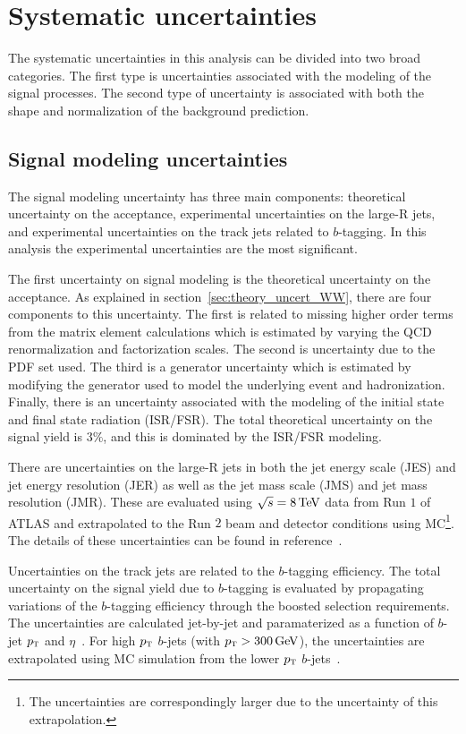\section{Systematic uncertainties}

The systematic uncertainties in this analysis can be divided into two broad categories. The first type is uncertainties associated with the modeling of the signal processes. The second type of uncertainty is associated with both the shape and normalization of the background prediction. 

\subsection{Signal modeling uncertainties}

The signal modeling uncertainty has three main components: theoretical uncertainty on the acceptance, experimental uncertainties on the large-R jets, and experimental uncertainties on the track jets related to $b$-tagging. In this analysis the experimental uncertainties are the most significant. 

The first uncertainty on signal modeling is the theoretical uncertainty on the acceptance. As explained in section~\ref{sec:theory_uncert_WW}, there are four components to this uncertainty. The first is related to missing higher order terms from the matrix element calculations which is estimated by varying the QCD renormalization and factorization scales. The second is uncertainty due to the PDF set used. The third is a generator uncertainty which is estimated by modifying the generator used to model the underlying event and hadronization. Finally, there is an uncertainty associated with the modeling of the initial state and final state radiation (ISR/FSR). The total theoretical uncertainty on the signal yield is $3\%$, and this is dominated by the ISR/FSR modeling.

There are uncertainties on the large-R jets in both the jet energy scale (JES) and jet energy resolution (JER) as well as the jet mass scale (JMS) and jet mass resolution (JMR). These are evaluated using $\sqrt{s} = 8 \TeV$ data from Run $1$ of ATLAS and extrapolated to the Run $2$ beam and detector conditions using MC\footnote{The uncertainties are correspondingly larger due to the uncertainty of this extrapolation.}. The details of these uncertainties can be found in reference~\cite{LargeRUncert}. 

Uncertainties on the track jets are related to the $b$-tagging efficiency. The total uncertainty on the signal yield due to $b$-tagging is evaluated by propagating variations of the $b$-tagging efficiency through the boosted selection requirements. The uncertainties are calculated jet-by-jet and paramaterized as a function of $b$-jet $p_{\textrm{\footnotesize\sc t}}$ and $\eta$~\cite{BtagCalib1}. For high $p_{\textrm{\footnotesize\sc t}}$ $b$-jets (with $\pT > 300 \GeV$), the uncertainties are extrapolated using MC simulation from the lower $p_{\textrm{\footnotesize\sc t}}$ $b$-jets~\cite{BtagPaper}. 

